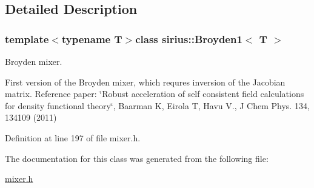 \subsection{Detailed Description}
\subsubsection*{template$<$typename T$>$class sirius\+::\+Broyden1$<$ T $>$}

Broyden mixer. 

First version of the Broyden mixer, which requres inversion of the Jacobian matrix. Reference paper\+: \char`\"{}\+Robust acceleration of self consistent field calculations for 
density functional theory\char`\"{}, Baarman K, Eirola T, Havu V., J Chem Phys. 134, 134109 (2011) 

Definition at line 197 of file mixer.\+h.



The documentation for this class was generated from the following file\+:\begin{DoxyCompactItemize}
\item 
\hyperlink{mixer_8h}{mixer.\+h}\end{DoxyCompactItemize}
